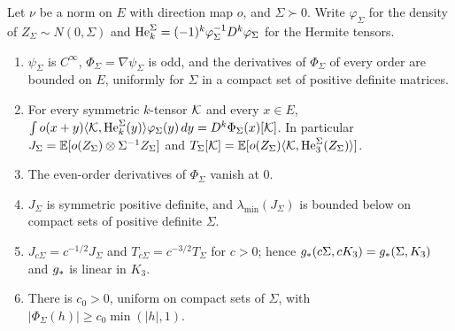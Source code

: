 \begin{lemma}\label{lem:gauss}
Let $\nu$ be a norm on $E$ with direction map $o$, and $\Sigma\succ0$. Write $\varphi_\Sigma$ for the density of
$Z_\Sigma\sim N(0,\Sigma)$ and $\mathrm{He}^\Sigma_k=(-1)^k\varphi_\Sigma^{-1}D^k\varphi_\Sigma$ for the Hermite tensors.
\begin{enumerate}
\item $\psi_\Sigma$ is $C^\infty$, $\Phi_\Sigma=\nabla\psi_\Sigma$ is odd, and the derivatives of $\Phi_\Sigma$ of every
order are bounded on $E$, uniformly for $\Sigma$ in a compact set of positive definite matrices.
\item For every symmetric $k$-tensor $\mathcal{K}$ and every $x\in E$,
$\int o(x+y)\langle \mathcal{K}, \mathrm{He}^\Sigma_k(y)\rangle\varphi_\Sigma(y)\,dy=D^k\Phi_\Sigma(x)[\mathcal{K}]$. In particular
$J_\Sigma=\mathbb{E}[o(Z_\Sigma)\otimes\Sigma^{-1}Z_\Sigma]$ and $T_\Sigma[\mathcal{K}]=\mathbb{E}[o(Z_\Sigma)\langle \mathcal{K}, \mathrm{He}_3^\Sigma(Z_\Sigma)\rangle]$.
\item The even-order derivatives of $\Phi_\Sigma$ vanish at $0$.
\item $J_\Sigma$ is symmetric positive definite, and $\lambda_{\min}(J_\Sigma)$ is bounded below on compact sets of
positive definite $\Sigma$.
\item $J_{c\Sigma}=c^{-1/2}J_\Sigma$ and $T_{c\Sigma}=c^{-3/2}T_\Sigma$ for $c>0$; hence $g_\ast(c\Sigma,cK_3)=g_\ast(\Sigma,K_3)$
and $g_\ast$ is linear in $K_3$.
\item There is $c_0>0$, uniform on compact sets of $\Sigma$, with $|\Phi_\Sigma(h)|\ge c_0\min(|h|,1)$.
\end{enumerate}
\end{lemma}
